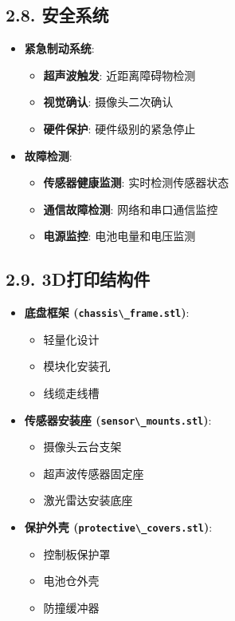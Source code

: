 \subsection{2.8. 安全系统}\label{ux5b89ux5168ux7cfbux7edf}

\begin{itemize}
\tightlist
\item
  \textbf{紧急制动系统}:

  \begin{itemize}
  \tightlist
  \item
    \textbf{超声波触发}: 近距离障碍物检测
  \item
    \textbf{视觉确认}: 摄像头二次确认
  \item
    \textbf{硬件保护}: 硬件级别的紧急停止
  \end{itemize}
\item
  \textbf{故障检测}:

  \begin{itemize}
  \tightlist
  \item
    \textbf{传感器健康监测}: 实时检测传感器状态
  \item
    \textbf{通信故障检测}: 网络和串口通信监控
  \item
    \textbf{电源监控}: 电池电量和电压监测
  \end{itemize}
\end{itemize}

\subsection{2.9. 3D打印结构件}\label{dux6253ux5370ux7ed3ux6784ux4ef6}

\begin{itemize}
\tightlist
\item
  \textbf{底盘框架 (\passthrough{\lstinline!chassis\_frame.stl!})}:

  \begin{itemize}
  \tightlist
  \item
    轻量化设计
  \item
    模块化安装孔
  \item
    线缆走线槽
  \end{itemize}
\item
  \textbf{传感器安装座 (\passthrough{\lstinline!sensor\_mounts.stl!})}:

  \begin{itemize}
  \tightlist
  \item
    摄像头云台支架
  \item
    超声波传感器固定座
  \item
    激光雷达安装底座
  \end{itemize}
\item
  \textbf{保护外壳 (\passthrough{\lstinline!protective\_covers.stl!})}:

  \begin{itemize}
  \tightlist
  \item
    控制板保护罩
  \item
    电池仓外壳
  \item
    防撞缓冲器
  \end{itemize}
\end{itemize}

